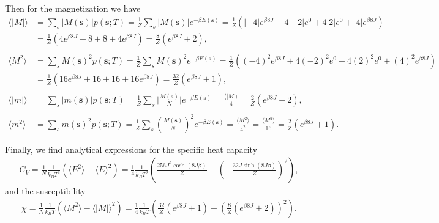 \documentclass[english,notitlepage,reprint,nofootinbib]{revtex4-1}  %
\begin{document}
Then for the magnetization we have
\begin{align*}
    \langle |M| \rangle &=  \sum_s |M(\textbf{s})|  p(\textbf{s};T) 
    = \frac{1}{Z} \sum_s |M(\textbf{s})| e^{-\beta E(\textbf{s})} 
    = \frac{1}{Z} \left( |-4|e^{\beta8J} + 4 |-2| e^0 + 4|2|e^0 + |4|e^{\beta 8J}\right) \\
    &= \frac{1}{Z} \left( 4e^{\beta8J} + 8 + 8 + 4e^{\beta 8J}\right)
    = \frac{8}{Z} \left( e^{\beta 8J} + 2 \right),
\\
\\
    \langle M^2 \rangle &= \sum_s M(\textbf{s})^2  p(\textbf{s};T) 
    = \frac{1}{Z} \sum_s M(\textbf{s})^2 e^{-\beta E(\textbf{s})} 
    = \frac{1}{Z} \left( (-4)^2 e^{\beta8J} + 4 (-2)^2 e^0 + 4(2)^2 e^0 + (4)^2 e^{\beta 8J}\right) \\
    &= \frac{1}{Z} \left( 16 e^{\beta8J} + 16 + 16 + 16 e^{\beta 8J}\right)
    = \frac{32}{Z} \left( e^{\beta 8J} + 1 \right),
\\
\\
    \langle |m| \rangle&= \sum_s |m(\textbf{s})|  p(\textbf{s};T) 
    = \frac{1}{Z} \sum_s \bigg| \frac{M(\textbf{s})}{N} \bigg| e^{-\beta E(\textbf{s})}
    = \frac{\langle|M| \rangle}{4}
    = \frac{2}{Z} \left( e^{\beta 8J} + 2 \right),
\\
\\
    \langle m^2 \rangle &= \sum_s m(\textbf{s})^2  p(\textbf{s};T)
    = \frac{1}{Z} \sum_s \left( \frac{M(\textbf{s})}{N} \right)^2 e^{-\beta E(\textbf{s})}
    = \frac{ \langle M^2 \rangle}{4^2}
    = \frac{ \langle M^2 \rangle}{16}
    = \frac{2}{Z} \left( e^{\beta 8J} + 1 \right).
\end{align*}

Finally, we find analytical expressions for the specific heat capacity
\begin{align*}
    C_V = \frac{1}{N} \frac{1}{k_B T^2} \left( \langle E^2 \rangle - \langle E \rangle^2 \right)
    = \frac{1}{4} \frac{1}{k_B T^2} \left( \frac{256 J^2 \cosh(8J \beta)}{Z} - \left( - \frac{32 J \sinh(8J \beta )}{Z} \right)^2 \right)
    ,
\end{align*}
and the susceptibility
\begin{align*}
    \chi = \frac{1}{N} \frac{1}{k_B T} \left( \langle M^2 \rangle - \langle |M| \rangle^2 \right)
    = \frac{1}{4} \frac{1}{k_B T} \left( \frac{32}{Z} \left( e^{\beta 8J} + 1 \right) - \left( \frac{8}{Z} \left( e^{\beta 8J} + 2 \right) \right)^2 \right).
\end{align*}
\end{document}
